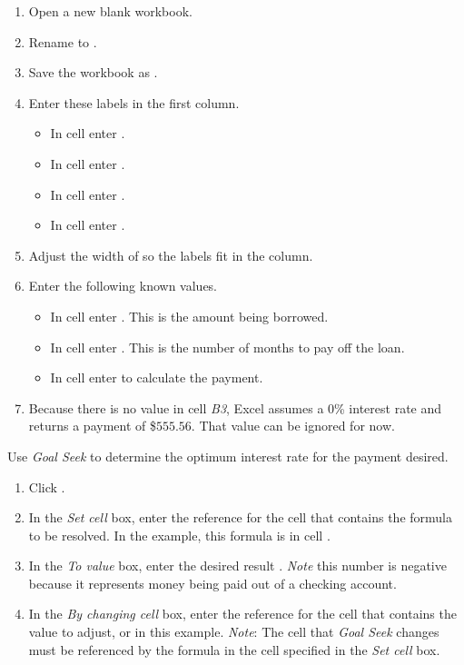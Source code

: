 \begin{enumerate}
	\item Open a new blank workbook.
	\item Rename  to .
	\item Save the workbook as .
	\item Enter these labels in the first column.

	\begin{itemize}
		\item In cell  enter .
		\item In cell  enter .
		\item In cell  enter .
		\item In cell  enter .
	\end{itemize}

	\item Adjust the width of  so the labels fit in the column.
	\item Enter the following known values.

	\begin{itemize}
		\item In cell  enter . This is the amount being borrowed.
		\item In cell  enter . This is the number of months to pay off the loan. 
		\item In cell  enter  to calculate the payment. 
	\end{itemize}

	\item Because there is no value in cell \textit{B3}, Excel assumes a $ 0 $\% interest rate and returns a payment of \$$ 555.56 $. That value can be ignored for now.
\end{enumerate}

Use \textit{Goal Seek} to determine the optimum interest rate for the payment desired.

\begin{enumerate}
	\item Click .
	\item In the \textit{Set cell} box, enter the reference for the cell that contains the formula to be resolved. In the example, this formula is in cell .
	\item In the \textit{To value} box, enter the desired result . \textit{Note} this number is negative because it represents money being paid out of a checking account.
	\item In the \textit{By changing cell} box, enter the reference for the cell that contains the value to adjust, or  in this example. \textit{Note}: The cell that \textit{Goal Seek} changes must be referenced by the formula in the cell specified in the \textit{Set cell} box.
	
\end{enumerate}

